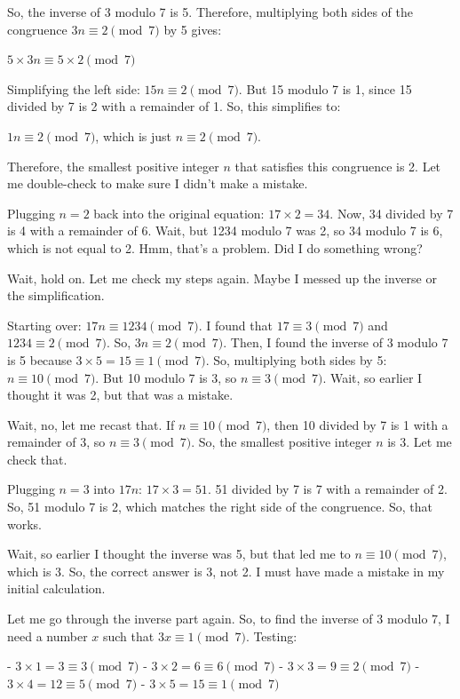 \begin{tcolorbox}[modelbox, title=DeepSeek-R1-Distill-Qwen-1.5B]
So, the inverse of 3 modulo 7 is 5. Therefore, multiplying both sides of the congruence \( 3n \equiv 2 \pmod{7} \) by 5 gives:

\( 5 \times 3n \equiv 5 \times 2 \pmod{7} \)

Simplifying the left side: \( 15n \equiv 2 \pmod{7} \). But 15 modulo 7 is 1, since 15 divided by 7 is 2 with a remainder of 1. So, this simplifies to:

\( 1n \equiv 2 \pmod{7} \), which is just \( n \equiv 2 \pmod{7} \).

Therefore, the smallest positive integer \( n \) that satisfies this congruence is 2. Let me double-check to make sure I didn't make a mistake.

Plugging \( n = 2 \) back into the original equation: \( 17 \times 2 = 34 \). Now, 34 divided by 7 is 4 with a remainder of 6. Wait, but 1234 modulo 7 was 2, so 34 modulo 7 is 6, which is not equal to 2. Hmm, that's a problem. Did I do something wrong?

Wait, hold on. Let me check my steps again. Maybe I messed up the inverse or the simplification.

Starting over: \( 17n \equiv 1234 \pmod{7} \). I found that \( 17 \equiv 3 \pmod{7} \) and \( 1234 \equiv 2 \pmod{7} \). So, \( 3n \equiv 2 \pmod{7} \). Then, I found the inverse of 3 modulo 7 is 5 because \( 3 \times 5 = 15 \equiv 1 \pmod{7} \). So, multiplying both sides by 5: \( n \equiv 10 \pmod{7} \). But 10 modulo 7 is 3, so \( n \equiv 3 \pmod{7} \). Wait, so earlier I thought it was 2, but that was a mistake.

Wait, no, let me recast that. If \( n \equiv 10 \pmod{7} \), then 10 divided by 7 is 1 with a remainder of 3, so \( n \equiv 3 \pmod{7} \). So, the smallest positive integer \( n \) is 3. Let me check that.

Plugging \( n = 3 \) into \( 17n \): \( 17 \times 3 = 51 \). 51 divided by 7 is 7 with a remainder of 2. So, 51 modulo 7 is 2, which matches the right side of the congruence. So, that works.

Wait, so earlier I thought the inverse was 5, but that led me to \( n \equiv 10 \pmod{7} \), which is 3. So, the correct answer is 3, not 2. I must have made a mistake in my initial calculation.

Let me go through the inverse part again. So, to find the inverse of 3 modulo 7, I need a number \( x \) such that \( 3x \equiv 1 \pmod{7} \). Testing:

- \( 3 \times 1 = 3 \equiv 3 \pmod{7} \)
- \( 3 \times 2 = 6 \equiv 6 \pmod{7} \)
- \( 3 \times 3 = 9 \equiv 2 \pmod{7} \)
- \( 3 \times 4 = 12 \equiv 5 \pmod{7} \)
- \( 3 \times 5 = 15 \equiv 1 \pmod{7} \)


\end{tcolorbox}

